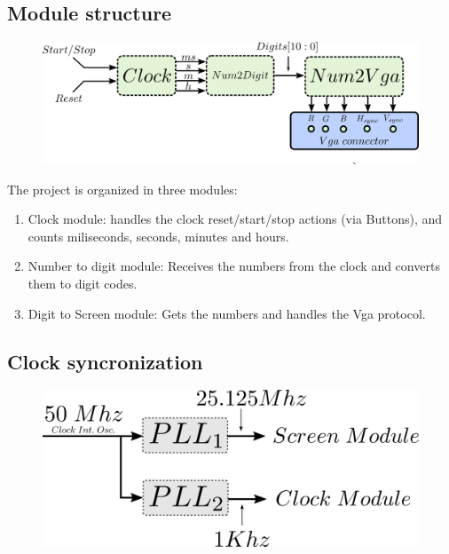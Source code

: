 \newpage



\subsection*{Module structure}
\begin{figure}[htbp]
    \begin{center}
    \includegraphics[scale=0.8]{dibujos/estructura.png}
    
    \end{center}
    
    \label{fig:Estructura}
    \end{figure}

The project is organized in three modules:
\begin{enumerate}
\item Clock module: handles the clock reset/start/stop actions (via Buttons), and counts miliseconds, seconds, minutes and hours.
\item Number to digit module: Receives the numbers from the clock and converts them to digit codes.
\item Digit to Screen module: Gets the numbers and handles the Vga protocol. 
\end{enumerate}


\subsection*{Clock syncronization}
\begin{figure}[htbp]
    \begin{center}
    \includegraphics[scale=0.8]{dibujos/pll.png}
    
    \end{center}
    
    \label{fig:Pll}
    \end{figure}

